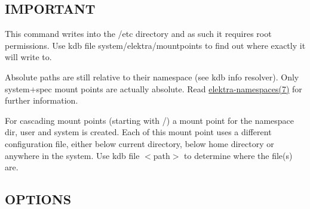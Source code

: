 \subsection*{I\+M\+P\+O\+R\+T\+A\+NT}

This command writes into the {\ttfamily /etc} directory and as such it requires root permissions. Use {\ttfamily kdb file system/elektra/mountpoints} to find out where exactly it will write to.

Absolute paths are still relative to their namespace (see {\ttfamily kdb info resolver}). Only system+spec mount points are actually absolute. Read \hyperlink{doc_help_elektra-namespaces_md}{elektra-\/namespaces(7)} for further information.

For cascading mount points (starting with {\ttfamily /}) a mount point for the namespace {\ttfamily dir}, {\ttfamily user} and {\ttfamily system} is created. Each of this mount point uses a different configuration file, either below current directory, below home directory or anywhere in the system. Use {\ttfamily kdb file $<$path$>$} to determine where the file(s) are.

\subsection*{O\+P\+T\+I\+O\+NS}


